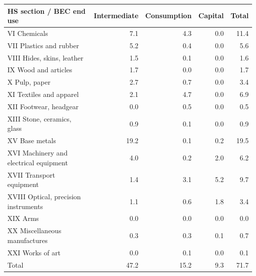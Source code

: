 \begin{tabular}{lrrrr}
\toprule
HS section / BEC end use & Intermediate & Consumption & Capital & Total \\
\midrule
VI Chemicals & 7.1 & 4.3 & 0.0 & 11.4 \\
VII Plastics and rubber & 5.2 & 0.4 & 0.0 & 5.6 \\
VIII Hides, skins, leather & 1.5 & 0.1 & 0.0 & 1.6 \\
IX Wood and articles & 1.7 & 0.0 & 0.0 & 1.7 \\
X Pulp, paper & 2.7 & 0.7 & 0.0 & 3.4 \\
XI Textiles and apparel & 2.1 & 4.7 & 0.0 & 6.9 \\
XII Footwear, headgear & 0.0 & 0.5 & 0.0 & 0.5 \\
XIII Stone, ceramics, glass & 0.9 & 0.1 & 0.0 & 0.9 \\
XV Base metals & 19.2 & 0.1 & 0.2 & 19.5 \\
XVI Machinery and electrical equipment & 4.0 & 0.2 & 2.0 & 6.2 \\
XVII Transport equipment & 1.4 & 3.1 & 5.2 & 9.7 \\
XVIII Optical, precision instruments & 1.1 & 0.6 & 1.8 & 3.4 \\
XIX Arms & 0.0 & 0.0 & 0.0 & 0.0 \\
XX Miscellaneous manufactures & 0.3 & 0.3 & 0.1 & 0.7 \\
XXI Works of art & 0.0 & 0.1 & 0.0 & 0.1 \\
\midrule
Total & 47.2 & 15.2 & 9.3 & 71.7 \\
\bottomrule
\end{tabular}
